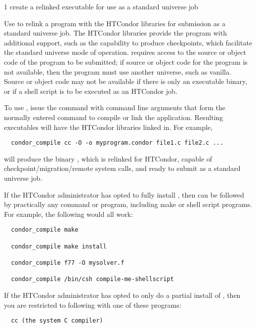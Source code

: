\begin{ManPage}{\label{man-condor-compile}}{1}
{create a relinked executable for use as a standard universe job}


\Synopsis {}

\Description

Use  to relink a program with the HTCondor libraries for
submission as a standard universe job.
The HTCondor libraries provide the program with additional support, such
as the capability to produce checkpoints, 
which facilitate the standard universe mode of operation.
 requires access to the source or object code of the
program to be submitted; if source or object code for the program is
not available,
then the program must use another universe, such as vanilla.
Source or object code may not be available if there is 
only an executable binary, or if a shell script is to be executed as
an HTCondor job. 

To use , issue the command
 with command line arguments that form
the normally entered command to compile or link the application.
Resulting executables will have the HTCondor libraries linked in.
For example, 
\footnotesize
\begin{verbatim}
  condor_compile cc -O -o myprogram.condor file1.c file2.c ... 
\end{verbatim}
\normalsize
will produce the binary , 
which is relinked for HTCondor,
capable of checkpoint/migration/remote system calls, and ready to
submit as a standard universe job.  

If the HTCondor administrator has opted to fully install
, then  can be followed by practically
any command or program, including make or shell script programs.
For example, the following would all work:
\footnotesize
\begin{verbatim}
  condor_compile make 

  condor_compile make install 

  condor_compile f77 -O mysolver.f 

  condor_compile /bin/csh compile-me-shellscript 
\end{verbatim}
\normalsize

If the HTCondor administrator has opted to only do a partial install of
, then you are restricted to following 
with one of these programs:  
\footnotesize
\begin{verbatim}
  cc (the system C compiler) 


\end{verbatim}
\end{ManPage}
